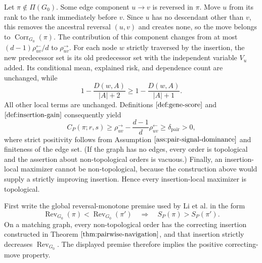 Let \(\pi\notin\Pi(G_0)\).  Some edge component \(u\to v\) is reversed in \(\pi\).  Move \(u\) from its rank to the rank immediately before \(v\).  Since \(u\) has no descendant other than \(v\), this removes the ancestral reversal \((u,v)\) and creates none, so the move belongs to \(\operatorname{Corr}_{G_0}(\pi)\).  The contribution of this component changes from at most \((d-1)\rho^{\leftarrow}_{uv}/d\) to \(\rho^{\to}_{uv}\).  For each node \(w\) strictly traversed by the insertion, the new predecessor set is its old predecessor set with the independent variable \(V_u\) added.  Its conditional mean, explained risk, and dependence count are unchanged, while
\[
 1-\frac{D(w,A)}{|A|+2}\ge 1-\frac{D(w,A)}{|A|+1}.
\]
All other local terms are unchanged.  Definitions \(\ref{def:gene-score}\) and \(\ref{def:insertion-gain}\) consequently yield
\[
 C_P(\pi;r,s)
 \ge \rho^{\to}_{uv}-\frac{d-1}{d}\rho^{\leftarrow}_{uv}
 \ge\delta_{\mathrm{pair}}>0,
\]
where strict positivity follows from Assumption \(\ref{ass:pair-signal-dominance}\) and finiteness of the edge set.  (If the graph has no edges, every order is topological and the assertion about non-topological orders is vacuous.)  Finally, an insertion-local maximizer cannot be non-topological, because the construction above would supply a strictly improving insertion.  Hence every insertion-local maximizer is topological.

First write the global reversal-monotone premise used by Li et al. in the form
\[
 \operatorname{Rev}_{G_0}(\pi)<\operatorname{Rev}_{G_0}(\pi')
 \quad\Longrightarrow\quad S_P(\pi)>S_P(\pi').
\]
On a matching graph, every non-topological order has the correcting insertion constructed in Theorem \(\ref{thm:pairwise-navigation}\), and that insertion strictly decreases \(\operatorname{Rev}_{G_0}\).  The displayed premise therefore implies the positive correcting-move property.

